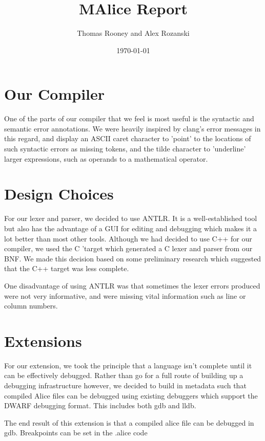 \documentclass[a4wide, 11pt]{article}
\begin{document}
\title{MAlice Report}

\author{Thomas Rooney and Alex Rozanski}

\date{\today}

\maketitle

\section{Our Compiler}

One of the parts of our compiler that we feel is most useful is the syntactic and semantic error annotations. We were heavily inspired by clang's error messages in this regard, and display an ASCII caret character to 'point' to the locations of such syntactic errors as missing tokens, and the tilde character to 'underline' larger expressions, such as operands to a mathematical operator.

\section{Design Choices}

For our lexer and parser, we decided to use ANTLR. It is a well-established tool but also has the advantage of a GUI for editing and debugging which makes it a lot better than most other tools. Although we had decided to use C++ for our compiler, we used the C 'target which generated a C lexer and parser from our BNF. We made this decision based on some preliminary research which suggested that the C++ target was less complete.

One disadvantage of using ANTLR was that sometimes the lexer errors produced were not very informative, and were missing vital information such as line or column numbers.

\section{Extensions}

For our extension, we took the principle that a language isn't complete until it can be effectively debugged. Rather than go for a full route of building up a debugging infrastructure however, we decided to build in metadata such that compiled Alice files can be debugged using existing debuggers which support the DWARF debugging format. This includes both gdb and lldb.

The end result of this extension is that a compiled alice file can be debugged in gdb. Breakpoints can be set in the .alice code 
\end{document}

